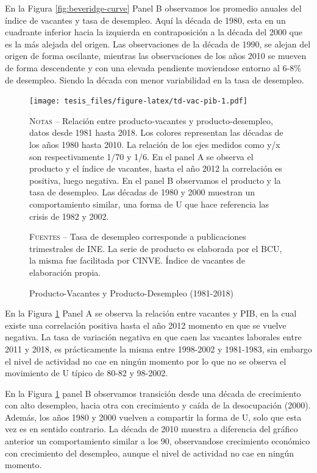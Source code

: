 \documentclass[12pt,oneside]{reedthesis}
\begin{document}
En la Figura \ref{fig:beveridge-curve} Panel B observamos los promedio anuales del índice de vacantes y tasa de desempleo. Aquí la década de 1980, esta en un cuadrante inferior hacia la izquierda en contraposición a la década del 2000 que es la más alejada del origen. Las observaciones de la década de 1990, se alejan del origen de forma oscilante, mientras las observaciones de los años 2010 se mueven de forma descendente y con una elevada pendiente moviendose entorno al 6-8\% de desempleo. Siendo la década con menor variabilidad en la tasa de desempleo.
\begin{figure}
\texttt{[image: tesis\_files/figure-latex/td-vac-pib-1.pdf]}
\caption{Producto-Vacantes y Producto-Desempleo (1981-2018)}\label{fig:td-vac-pib}\textsc{}

\footnotesize\textsc{Notas} -- Relación entre producto-vacantes y producto-desempleo, datos desde 1981 hasta 2018. Los colores representan las décadas de los años 1980 hasta 2010. La relación de los ejes medidos como y/x son respectivamente 1/70 y 1/6. En el panel A se observa el producto y el índice de vacantes, hasta el año 2012 la correlación es positiva, luego negativa. En el panel B observamos el producto y la tasa de desempleo. Las décadas de 1980 y 2000 muestran un comportamiento similar, una forma de U que hace referencia las crisis de 1982 y 2002.

\textsc{Fuentes} -- Tasa de desempleo corresponde a publicaciones trimestrales de INE. La serie de producto es elaborada por el BCU, la misma fue facilitada por CINVE. Índice de vacantes de elaboración propia.
\end{figure}
En la Figura \ref{fig:td-vac-pib} Panel A se observa la relación entre vacantes y PIB, en la cual existe una correlación positiva hasta el año 2012 momento en que se vuelve negativa. La tasa de variación negativa en que caen las vacantes laborales entre 2011 y 2018, es prácticamente la misma entre 1998-2002 y 1981-1983, sin embargo el nivel de actividad no cae en ningún momento por lo que no se observa el movimiento de U típico de 80-82 y 98-2002.

En la Figura \ref{fig:td-vac-pib} panel B observamos transición desde una década de crecimiento con alto desempleo, hacia otra con crecimiento y caída de la desocupación (2000). Además, los años 1980 y 2000 vuelven a compartir la forma de U, solo que esta vez es en sentido contrario. La década de 2010 muestra a diferencia del gráfico anterior un comportamiento similar a los 90, observandose crecimiento económico con crecimiento del desempleo, aunque el nivel de actividad no cae en ningún momento.
\end{document}
